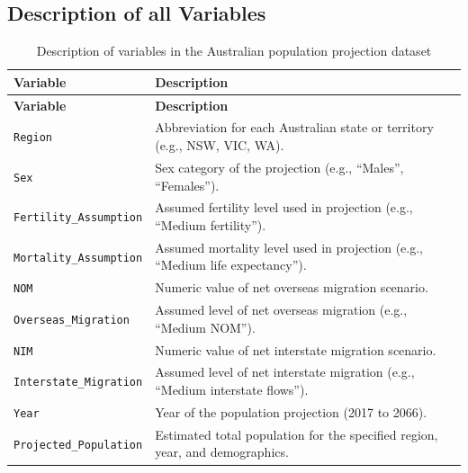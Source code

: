 \documentclass[
  11pt,
]{article}
\begin{document}
\subsection{Description of all
Variables}\label{description-of-all-variables}

\begin{longtable}[]{@{}
  >{\raggedright\arraybackslash}p{}
  >{\raggedright\arraybackslash}p{}@{}}
\caption{Description of variables in the Australian population
projection dataset}\label{tbl-vars}\tabularnewline
\toprule\noalign{}
\begin{minipage}[b]{\linewidth}\raggedright
\textbf{Variable}
\end{minipage} & \begin{minipage}[b]{\linewidth}\raggedright
\textbf{Description}
\end{minipage} \\
\midrule\noalign{}
\endfirsthead
\toprule\noalign{}
\begin{minipage}[b]{\linewidth}\raggedright
\textbf{Variable}
\end{minipage} & \begin{minipage}[b]{\linewidth}\raggedright
\textbf{Description}
\end{minipage} \\
\midrule\noalign{}
\endhead
\bottomrule\noalign{}
\endlastfoot
\texttt{Region} & Abbreviation for each Australian state or territory
(e.g., NSW, VIC, WA). \\
\texttt{Sex} & Sex category of the projection (e.g., ``Males'',
``Females''). \\
\texttt{Fertility\_Assumption} & Assumed fertility level used in
projection (e.g., ``Medium fertility''). \\
\texttt{Mortality\_Assumption} & Assumed mortality level used in
projection (e.g., ``Medium life expectancy''). \\
\texttt{NOM} & Numeric value of net overseas migration scenario. \\
\texttt{Overseas\_Migration} & Assumed level of net overseas migration
(e.g., ``Medium NOM''). \\
\texttt{NIM} & Numeric value of net interstate migration scenario. \\
\texttt{Interstate\_Migration} & Assumed level of net interstate
migration (e.g., ``Medium interstate flows''). \\
\texttt{Year} & Year of the population projection (2017 to 2066). \\
\texttt{Projected\_Population} & Estimated total population for the
specified region, year, and demographics. \\
\end{longtable}
\end{document}
